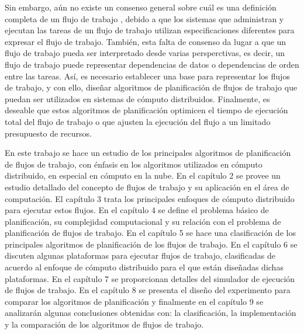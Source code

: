 Sin embargo, aún no existe un consenso general sobre cuál es una definición completa de un flujo de trabajo \cite{van2003workflow}, debido a que los sistemas que administran y ejecutan las tareas de un flujo de trabajo utilizan especificaciones diferentes para expresar el flujo de trabajo. También, esta falta de consenso da lugar a que un flujo de trabajo pueda ser interpretado desde varias persperctivas, es decir, un flujo de trabajo puede representar dependencias de datos o dependencias de orden entre las tareas. Así, es necesario establecer una base para representar los flujos de trabajo, y con ello, diseñar algoritmos de planificación de flujos de trabajo que puedan ser utilizados en sistemas de cómputo distribuidos. Finalmente, es deseable que estos algoritmos de planificación optimicen el tiempo de ejecución total del flujo de trabajo o que ajusten la ejecución del flujo a un limitado presupuesto de recursos.




En este trabajo se hace un estudio de los principales algoritmos de planificación de flujos de trabajo, con énfasis en los algoritmos utilizados en cómputo distribuido, en especial en cómputo en la nube. En el capítulo 2 se provee un estudio detallado del concepto de flujos de trabajo y su aplicación en el área de computación. El capítulo 3 trata los principales enfoques de cómputo distribuido para ejecutar estos flujos. En el capítulo 4 se define el problema básico de planificación, su complejidad computacional y su relación con el problema de planificación de flujos de trabajo. En el capítulo 5 se hace una clasificación de los principales algoritmos de planificación de los flujos de trabajo. En el capítulo 6 se discuten	algunas plataformas para ejecutar flujos de trabajo, clasificadas de acuerdo al enfoque de cómputo distribuido para el que están diseñadas dichas plataformas. En el capítulo 7 se proporcionan detalles del simulador de ejecución de flujos de trabajo. En el capítulo 8 se presenta el diseño del experimento para comparar los algoritmos de planificación y finalmente en el capítulo 9 se analizarán algunas conclusiones obtenidas con: la clasificación, la implementación y la comparación de los algoritmos de flujos de trabajo.
